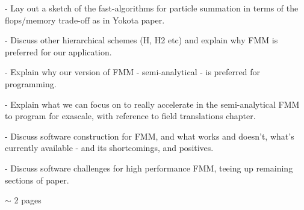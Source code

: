 - Lay out a sketch of the fast-algorithms for particle summation in terms of the flops/memory trade-off as in Yokota paper.

- Discuss other hierarchical schemes (H, H2 etc) and explain why FMM is preferred for our application.

- Explain why our version of FMM - semi-analytical - is preferred for programming.

- Explain what we can focus on to really accelerate in the semi-analytical FMM to program for exascale, with reference to field translations chapter.

- Discuss software construction for FMM, and what works and doesn't, what's currently available - and its shortcomings, and positives.

- Discuss software challenges for high performance FMM, teeing up remaining sections of paper.

$\sim$ 2 pages